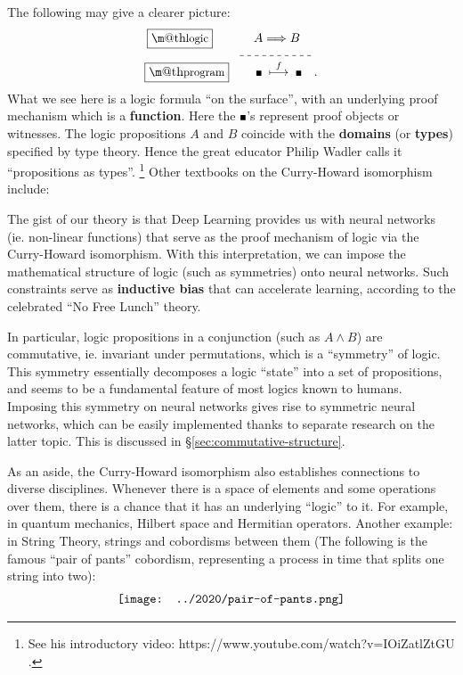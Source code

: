 \documentclass[orivec]{llncs}
\makeatletter
\newcommand{\witness}{\scalebox{0.6}{$\blacksquare$}}
\newcommand{\underdash}[1]{%
	\tikz[baseline=(toUnderline.base)]{
		\node[inner sep=1pt,outer sep=10pt] (toUnderline) {#1};
		\draw[dashed] ([yshift=-0pt]toUnderline.south west) -- ([yshift=-0pt]toUnderline.south east);
	}%
}%
\renewcommand{\boxed}[1]{\fbox{\m@th$\displaystyle\scalebox{0.9}{#1}$} \,}
\makeatother
\begin{document}
The following may give a clearer picture:
\begin{equation}
\label{eqn:Curry-Howard}
\begin{aligned}
\boxed{\mbox{logic}} \quad \quad \underdash{$A \Longrightarrow B$} & \\
\boxed{\mbox{program}} \quad \quad \witness \; \stackrel{f}{\longmapsto} \; \witness \hspace*{10pt} & .
\end{aligned}
\end{equation}
What we see here is a logic formula ``on the surface'', with an underlying proof mechanism which is a \textbf{function}.  Here the $\witness$'s represent proof objects or witnesses.  The logic propositions $A$ and $B$ coincide with the \textbf{domains} (or \textbf{types}) specified by type theory.  Hence the great educator Philip Wadler calls it ``propositions as types''. \footnote{See his introductory video: https://www.youtube.com/watch?v=IOiZatlZtGU .} 
Other textbooks on the Curry-Howard isomorphism include: \cite{}

The gist of our theory is that Deep Learning provides us with neural networks (ie. non-linear functions) that serve as the proof mechanism of logic via the Curry-Howard isomorphism.  With this interpretation, we can impose the mathematical structure of logic (such as symmetries) onto neural networks.  Such constraints serve as \textbf{inductive bias} that can accelerate learning, according to the celebrated ``No Free Lunch'' theory.

In particular, logic propositions in a conjunction (such as $A \wedge B$) are commutative, ie. invariant under permutations, which is a ``symmetry'' of logic.  This symmetry essentially decomposes a logic ``state'' into a set of propositions, and seems to be a fundamental feature of most logics known to humans.  Imposing this symmetry on neural networks gives rise to symmetric neural networks, which can be easily implemented thanks to separate research on the latter topic.  This is discussed in \S\ref{sec:commutative-structure}.

As an aside, the Curry-Howard isomorphism also establishes connections to diverse disciplines.  Whenever there is a space of elements and some operations over them, there is a chance that it has an underlying ``logic'' to it.  For example, in quantum mechanics, Hilbert space and Hermitian operators.  Another example: in String Theory, strings and cobordisms between them (The following is the famous ``pair of pants'' cobordism, representing a process in time that splits one string into two):
\begin{equation}
\vcenter{\hbox{\texttt{[image: ../2020/pair-of-pants.png]}}}
\end{equation}
\end{document}
